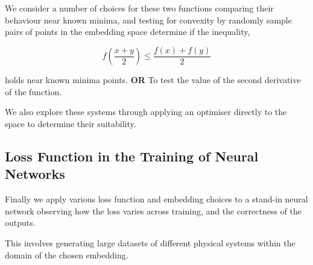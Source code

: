 We consider a number of choices for these two functions comparing their behaviour near known minima, and testing for convexity by randomly sample pairs of points in the embedding space determine if the inequality,

\begin{equation}
  f\left(\frac{x+y}{2}\right) \le \frac{f(x)+f(y)}{2}
\end{equation}

holds near known minima points. \textbf{OR} To test the value of the second derivative of the function.

We also explore these systems through applying an optimiser directly to the space to determine their suitability.


\subsection{Loss Function in the Training of Neural Networks}

Finally we apply various loss function and embedding choices to a stand-in neural network observing how the loss varies across training, and the correctness of the outputs.

This involves generating large datasets of different physical systems within the domain of the chosen embedding.


